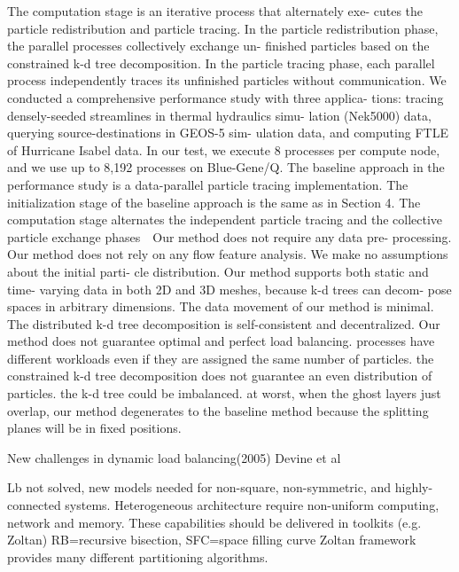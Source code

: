 \documentclass{article}
\begin{document}
The computation stage is an iterative process that alternately exe- cutes the particle redistribution and particle tracing. In the particle redistribution phase, the parallel processes collectively exchange un- finished particles based on the constrained k-d tree decomposition. In the particle tracing phase, each parallel process independently traces its unfinished particles without communication. 
We conducted a comprehensive performance study with three applica- tions: tracing densely-seeded streamlines in thermal hydraulics simu- lation (Nek5000) data, querying source-destinations in GEOS-5 sim- ulation data, and computing FTLE of Hurricane Isabel data.  In our test, we execute 8 processes per compute node, and we use up to 8,192 processes on Blue-Gene/Q.
The baseline approach in the performance study is a data-parallel particle tracing implementation. The initialization stage of the baseline approach is the same as in Section 4. The computation stage alternates the independent particle tracing and the collective particle exchange phases  
Our method does not require any data pre- processing.   Our method does not rely on any flow feature analysis.   We make no assumptions about the initial parti- cle distribution.  Our method supports both static and time- varying data in both 2D and 3D meshes, because k-d trees can decom- pose spaces in arbitrary dimensions.  The data movement of our method is minimal.  The distributed k-d tree decomposition is self-consistent and decentralized. 
Our method does not guarantee optimal and perfect load balancing.  processes have different workloads even if they are assigned the same number of particles.  the constrained k-d tree decomposition does not guarantee an even distribution of particles.  the k-d tree could be imbalanced.   at worst, when the ghost layers just overlap, our method degenerates to the baseline method because the splitting planes will be in fixed positions. 






\cite{DEVINE2005133}

New challenges in dynamic load balancing(2005)
Devine et al

Lb not solved, new models needed for non-square, non-symmetric, and highly-connected systems.  Heterogeneous architecture require non-uniform computing, network and memory.  These capabilities should be delivered in toolkits (e.g. Zoltan)
RB=recursive bisection, SFC=space filling curve
Zoltan framework provides many different partitioning algorithms.
\end{document}
